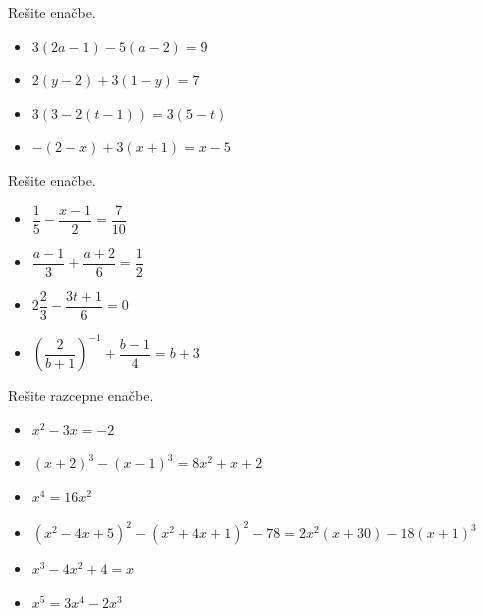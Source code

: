 
        
            \begin{naloga}
                Rešite enačbe.
                \begin{itemize}
                        \item $3(2a-1)-5(a-2)=9$ 
                        \item $2(y-2)+3(1-y)=7$ 
                        \item $3(3-2(t-1))=3(5-t)$ 
                        \item $-(2-x)+3(x+1)=x-5$ 
                \end{itemize}
            \end{naloga}
        


        
            \begin{naloga}
                Rešite enačbe.
                \begin{itemize}
                        \item $\dfrac{1}{5}-\dfrac{x-1}{2}=\dfrac{7}{10}$ 
                        \item $\dfrac{a-1}{3}+\dfrac{a+2}{6}=\dfrac{1}{2}$ 
                        \item $2\dfrac{2}{3}-\dfrac{3t+1}{6}=0$ 
                        \item $\left(\dfrac{2}{b+1}\right)^{-1}+\dfrac{b-1}{4}=b+3$ 
                \end{itemize}
            \end{naloga}
        



        
            \begin{naloga}
                Rešite razcepne enačbe.
                \begin{itemize}
                        \item $x^2-3x=-2$ 
                        \item $(x+2)^3-(x-1)^3=8x^2+x+2$ 
                        \item $x^4=16x^2$ 
                        \item $(x^2-4x+5)^2-(x^2+4x+1)^2-78=2x^2(x+30)-18(x+1)^3$ 
                        \item $x^3-4x^2+4=x$ 
                        \item $x^5=3x^4-2x^3$ 
                \end{itemize}
            \end{naloga}
        

